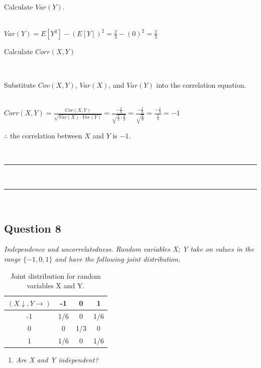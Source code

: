 \documentclass{article}
\begin{document}
\parbox{\textwidth}{Calculate $Var(Y)$.}\\

$Var(Y) = E[Y^2] - (E[Y])^2 = \frac{2}{3} - (0)^2 = \frac{2}{3}$\\

\parbox{\textwidth}{Calculate $Corr(X,Y)$}\\

\parbox{\textwidth}{Substitute $Cov(X,Y)$, $Var(X)$, and $Var(Y)$ into the correlation equation.}\\

$Corr(X,Y) = \frac{Cov(X,Y)}{\sqrt{Var(X) \cdot Var(Y)}} = \frac{-\frac{2}{3}}{\sqrt{\frac{2}{3} \cdot \frac{2}{3}}} = \frac{-\frac{2}{3}}{\sqrt{\frac{4}{9}}} = \frac{-\frac{2}{3}}{\frac{2}{3}} = -1$\\

\parbox{\textwidth}{$\therefore$ the correlation between $X$ and $Y$ is $-1$.}\\

\noindent\rule{\textwidth}{0.4pt}\\

\noindent\rule{\textwidth}{0.4pt}\\

\newpage

\subsection*{Question 8}
\textit{Independence and uncorrelatedness. Random variables X; Y take on values in the range $\{-1,0,1\}$ and have the following joint distribution.}\\

\begin{table}[h]
\centering
\begin{tabular}{c|ccc}
$(X\downarrow ,Y \rightarrow)$ & -1 & 0 & 1 \\ \hline
-1 & 1/6 & 0 & 1/6 \\
0 & 0 & 1/3 & 0 \\
1 & 1/6 & 0 & 1/6 \\
\end{tabular}
\caption{Joint distribution for random variables X and Y.}
\label{tab:example_fractions}
\end{table}

\begin{enumerate}[label=(a)]
  \item \textit{Are X and Y independent?}
\end{enumerate}
\end{document}
